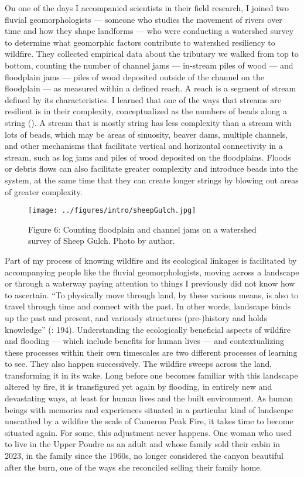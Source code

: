 \documentclass[
]{article}
\begin{document}
On one of the days I accompanied scientists in their field research, I joined two fluvial geomorphologists --- someone who studies the movement of rivers over time and how they shape landforms --- who were conducting a watershed survey to determine what geomorphic factors contribute to watershed resiliency to wildfire. They collected empirical data about the tributary we walked from top to bottom, counting the number of channel jams --- in-stream piles of wood --- and floodplain jams --- piles of wood deposited outside of the channel on the floodplain --- as measured within a defined reach. A reach is a segment of stream defined by its characteristics. I learned that one of the ways that streams are resilient is in their complexity, conceptualized as the numbers of beads along a string (). A stream that is mostly string has less complexity than a stream with lots of beads, which may be areas of sinuosity, beaver dams, multiple channels, and other mechanisms that facilitate vertical and horizontal connectivity in a stream, such as log jams and piles of wood deposited on the floodplains. Floods or debris flows can also facilitate greater complexity and introduce beads into the system, at the same time that they can create longer strings by blowing out areas of greater complexity.

\begin{figure}
\centering
\texttt{[image: ../figures/intro/sheepGulch.jpg]}
\caption{Figure 6: Counting floodplain and channel jams on a watershed survey of Sheep Gulch. Photo by author.}
\end{figure}

Part of my process of knowing wildfire and its ecological linkages is facilitated by accompanying people like the fluvial geomorphologists, moving across a landscape or through a waterway paying attention to things I previously did not know how to ascertain. ``To physically move through land, by these various means, is also to travel through time and connect with the past. In other words, landscape binds up the past and present, and variously structures (pre-)history and holds knowledge'' (: 194). Understanding the ecologically beneficial aspects of wildfire and flooding --- which include benefits for human lives --- and contextualizing these processes within their own timescales are two different processes of learning to see. They also happen successively. The wildfire sweeps across the land, transforming it in its wake. Long before one becomes familiar with this landscape altered by fire, it is transfigured yet again by flooding, in entirely new and devastating ways, at least for human lives and the built environment. As human beings with memories and experiences situated in a particular kind of landscape unscathed by a wildfire the scale of Cameron Peak Fire, it takes time to become situated again. For some, this adjustment never happens. One woman who used to live in the Upper Poudre as an adult and whose family sold their cabin in 2023, in the family since the 1960s, no longer considered the canyon beautiful after the burn, one of the ways she reconciled selling their family home.
\end{document}
